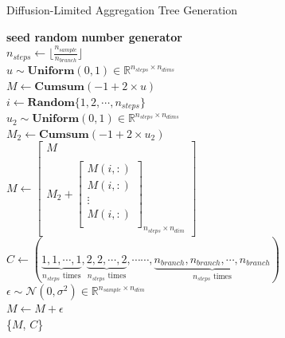 \begin{algorithm}
\caption{Diffusion-Limited Aggregation Tree Generation}
\label{alg:DLA}
    \textbf{seed random number generator}\\
    $n_{steps} \gets \lfloor\frac{n_{sample}}{n_{branch}}\rfloor$\\
    $u \sim \textbf{Uniform}(0,1)\in\mathbb{R}^{n_{steps} \times n_{dims}}$\\
    $M \gets \textbf{Cumsum}(-1 + 2 \times u)$\\
    {
         $i \gets \textbf{Random}\{1,2,\cdots, n_{steps}\}$\\
         $u_2 \sim \textbf{Uniform}(0,1)\in\mathbb{R}^{n_{steps} \times n_{dims}}$\\
         $M_2 \gets \textbf{Cumsum}(-1 + 2 \times u_2)$\\
        $M \gets \begin{bmatrix}M \\\\
            M_2 +\left[\begin{array}{c} 
                M(i, :)\\
                M(i, :)\\
                \vdots\\
                M(i, :)\\
        \end{array}\right]_{n_{steps}\times n_{dim}} \end{bmatrix}$\\
    }
    $C \gets (\underbrace{1,1,\cdots, 1}_{n_{steps} \text{ times}}, \underbrace{2,2,\cdots, 2}_{n_{steps} \text{ times}},  \cdots\cdots, \underbrace{n_{branch},n_{branch},\cdots, n_{branch}}_{n_{steps} \text{ times}})$\\
    $\epsilon \sim \mathcal{N}(0, \sigma^2)\in\mathbb{R}^{n_{sample}\times n_{dim}}$\\
    $M \gets M + \epsilon$\\
    \Return \{$M$, $C$\}\\
\end{algorithm}


